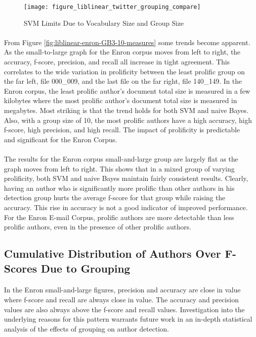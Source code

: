 \begin{figure}[htbp!]
	\begin{center}
	\centering
	\texttt{[image: figure\_liblinear\_twitter\_grouping\_compare]}
	\caption{SVM Limits Due to Vocabulary Size and Group Size}
	\label{fig:liblinear-twitter-GB3-10-measures}
	\end{center}
\end{figure}
	
	\paragraph*{} From Figure \ref{fig:liblinear-enron-GB3-10-measures} some trends become apparent.  As the small-to-large graph for the Enron corpus moves from left to right, the accuracy, f-score, precision, and recall all increase in tight agreement.  This correlates to the wide variation in prolificity between the least prolific group on the far left, file 000\_009, and the last file on the far right, file 140\_149.  In the Enron corpus, the least prolific author's document total size is measured in a few kilobytes where the most prolific author's document total size is measured in megabytes.  Most striking is that the trend holds for both SVM and naive Bayes.  Also, with a group size of 10, the most prolific authors have a high accuracy, high f-score, high precision, and high recall.  The impact of prolificity is predictable and significant for the Enron Corpus.
	\paragraph*{} The results for the Enron corpus small-and-large group are largely flat as the graph moves from left to right.  This shows that in a mixed group of varying prolificity, both SVM and naive Bayes maintain fairly consistent results.  Clearly, having an author who is significantly more prolific than other authors in his detection group hurts the average f-score for that group while raising the accuracy.  This rise in accuracy is not a good indicator of improved performance.  For the Enron E-mail Corpus, prolific authors are more detectable than less prolific authors, even in the presence of other prolific authors.
	
	\subsection{Cumulative Distribution of Authors Over F-Scores Due to Grouping}
	\paragraph*{} In the Enron small-and-large figures, precision and accuracy are close in value where f-score and recall are always close in value.  The accuracy and precision values are also always above the f-score and recall values.  Investigation into the underlying reasons for this pattern warrants future work in an in-depth statistical analysis of the effects of grouping on author detection.
